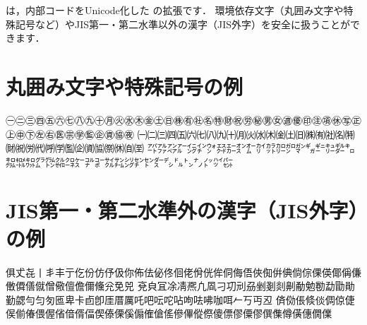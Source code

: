 \documentclass[rinkou,a4paper]{ieicej}
\begin{document}



\appendix
{}

\upLaTeX は，内部コードをUnicode化した \pLaTeX の拡張です．
環境依存文字（丸囲み文字や特殊記号など）やJIS第一・第二水準以外の漢字（JIS外字）を安全に扱うことができます．

\section{丸囲み文字や特殊記号の例}
㊀㊁㊂㊃㊄㊅㊆㊇㊈㊉㊊㊋㊌㊍㊎㊏㊐㊑㊒㊓㊔㊕㊖㊗㊘㊙㊚㊛㊜㊝㊞㊟㊠㊡㊢㊣㊤㊥㊦㊧㊨㊩㊪㊫㊬㊭㊮㊯㊰
㈠㈡㈢㈣㈤㈥㈦㈧㈨㈩㈪㈫㈬㈭㈮㈯㈰㈱㈲㈳㈴㈵㈶㈷㈸㈹㈺㈻㈼㈽㈾㈿㉀㉁㉂㉃
㌀㌁㌂㌃㌄㌅㌆㌇㌈㌉㌊㌋㌌㌍㌎㌏㌐㌑㌒㌓㌔㌕㌖㌗㌘㌙㌚㌛㌜㌝㌞㌟㌠㌡㌢㌣㌤㌥㌦㌧㌨㌩㌪㌫

\section{JIS第一・第二水準外の漢字（JIS外字）の例}
俱𠀋㐂丨丯丰亍仡份仿伃伋你佈佉佖佟佪佬佾侊侔侗侮俉俠倁倂倎倘倧倮偀倻偁傔僌僲僐僦僧儆儃儋儞儵兊免兕
兗㒵冝凃凊凞凢凮刁㓛刓刕剉剗剡劓勈勉勌勐勖勛勤勰勻匀匇匜卑卡卣卽厓厝厲吒吧呍咜呫呴呿咈咖咡𠂉丂丏丒
㑪俲倀倐倓倜倞倢㑨偂偆偎偓偗偣偦偪偰傣傈傒傓傕傖傜傪𠌫傱傺傻僄僇僳僇僎𠍱僔僙僡僩㒒
\end{document}
